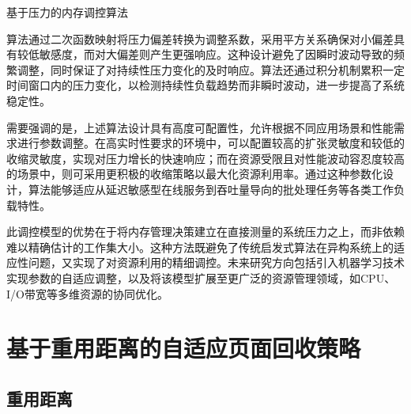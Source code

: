 \begin{algorithm}[H]
    \caption{基于压力的内存调控算法}
    \label{alg:control}
\end{algorithm}

算法通过二次函数映射将压力偏差转换为调整系数，采用平方关系确保对小偏差具有较低敏感度，而对大偏差则产生更强响应。这种设计避免了因瞬时波动导致的频繁调整，同时保证了对持续性压力变化的及时响应。算法还通过积分机制累积一定时间窗口内的压力变化，以检测持续性负载趋势而非瞬时波动，进一步提高了系统稳定性。

需要强调的是，上述算法设计具有高度可配置性，允许根据不同应用场景和性能需求进行参数调整。在高实时性要求的环境中，可以配置较高的扩张灵敏度和较低的收缩灵敏度，实现对压力增长的快速响应；而在资源受限且对性能波动容忍度较高的场景中，则可采用更积极的收缩策略以最大化资源利用率。通过这种参数化设计，算法能够适应从延迟敏感型在线服务到吞吐量导向的批处理任务等各类工作负载特性。

此调控模型的优势在于将内存管理决策建立在直接测量的系统压力之上，而非依赖难以精确估计的工作集大小。这种方法既避免了传统启发式算法在异构系统上的适应性问题，又实现了对资源利用的精细调控。未来研究方向包括引入机器学习技术实现参数的自适应调整，以及将该模型扩展至更广泛的资源管理领域，如CPU、I/O带宽等多维资源的协同优化。

\section{基于重用距离的自适应页面回收策略}
\label{sec:基于重用距离的冷热页面优化}

\subsection{重用距离}


